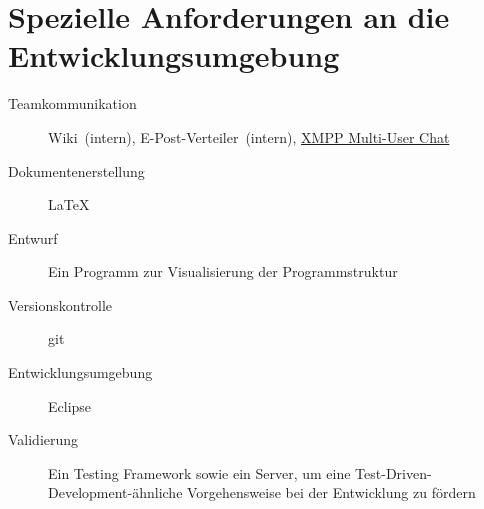 \section{Spezielle Anforderungen an die Entwicklungsumgebung}%

\begin{description}%
    \item [Teamkommunikation] Wiki~(intern), E-Post-Verteiler~(intern), \href{http://xmpp.org/extensions/xep-0045.html}{XMPP Multi-User Chat}
    \item [Dokumentenerstellung] \LaTeX{}%
    \item [Entwurf] Ein Programm zur Visualisierung der Programmstruktur
    \item [Versionskontrolle] git%
    \item [Entwicklungsumgebung] Eclipse%
    \item [Validierung] Ein Testing Framework sowie ein  Server, um eine Test-Driven-Development-ähnliche Vorgehensweise bei der Entwicklung zu fördern
\end{description}%
